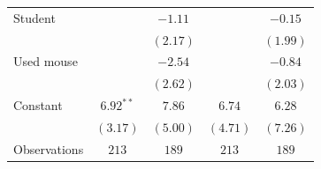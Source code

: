 \begin{tabular}{l c c c c}
Student                  &             & $-1.11$     &              & $-0.15$       \\
                         &             & $(2.17)$    &              & $(1.99)$      \\
Used mouse               &             & $-2.54$     &              & $-0.84$       \\
                         &             & $(2.62)$    &              & $(2.03)$      \\
Constant                 & $6.92^{**}$ & $7.86$      & $6.74$       & $6.28$        \\
                         & $(3.17)$    & $(5.00)$    & $(4.71)$     & $(7.26)$      \\
\midrule
Observations                & $213$       & $189$       & $213$        & $189$         \\
\bottomrule
\end{tabular}
